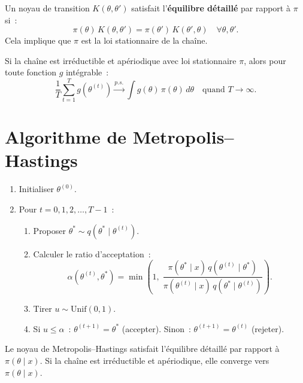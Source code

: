 \begin{definition}
Un noyau de transition $K(\theta, \theta')$ satisfait l'\textbf{\'equilibre
d\'etaill\'e} par rapport \`a $\pi$ si~:
\[
  \pi(\theta)\,K(\theta, \theta') = \pi(\theta')\,K(\theta', \theta)
  \quad \forall \theta, \theta'.
\]
Cela implique que $\pi$ est la loi stationnaire de la cha\^ine.
\end{definition}

\begin{theoreme}
Si la cha\^ine est irr\'eductible et ap\'eriodique avec loi
stationnaire $\pi$, alors pour toute fonction $g$ int\'egrable~:
\[
  \frac{1}{T}\sum_{t=1}^T g(\theta^{(t)}) \xrightarrow{p.s.}
  \int g(\theta)\,\pi(\theta)\,d\theta
  \quad \text{quand } T \to \infty.
\]
\end{theoreme}

\section{Algorithme de Metropolis--Hastings}

\begin{algorithme}[title=\textbf{Algorithme de Metropolis--Hastings}]
\begin{enumerate}
  \item Initialiser $\theta^{(0)}$.
  \item Pour $t = 0, 1, 2, \ldots, T-1$~:
  \begin{enumerate}
    \item Proposer $\theta^* \sim q(\theta^* \mid \theta^{(t)})$.
    \item Calculer le ratio d'acceptation~:
    \[
      \alpha(\theta^{(t)}, \theta^*) = \min\!\left(1,\;
      \frac{\pi(\theta^* \mid x)\,q(\theta^{(t)} \mid \theta^*)}
           {\pi(\theta^{(t)} \mid x)\,q(\theta^* \mid \theta^{(t)})}\right).
    \]
    \item Tirer $u \sim \text{Unif}(0, 1)$.
    \item Si $u \leq \alpha$~: $\theta^{(t+1)} = \theta^*$ (accepter).
          Sinon~: $\theta^{(t+1)} = \theta^{(t)}$ (rejeter).
  \end{enumerate}
\end{enumerate}
\end{algorithme}

\begin{theoreme}
Le noyau de Metropolis--Hastings satisfait l'\'equilibre d\'etaill\'e
par rapport \`a $\pi(\theta \mid x)$. Si la cha\^ine est
irr\'eductible et ap\'eriodique, elle converge vers $\pi(\theta \mid x)$.
\end{theoreme}

